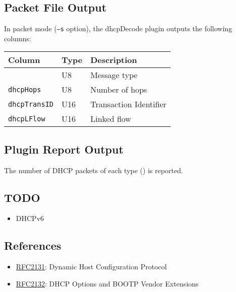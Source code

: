 \documentclass[documentation]{subfiles}
\begin{document}
\subsection{Packet File Output}
In packet mode ({\tt --s} option), the dhcpDecode plugin outputs the following columns:
\begin{longtable}{lll}
    \toprule
    {\bf Column} & {\bf Type} & {\bf Description}\\
    \midrule\endhead%
    {\tt \nameref{dhcpMType}} & U8  & Message type\\
    {\tt dhcpHops}            & U8  & Number of hops\\
    {\tt dhcpTransID}         & U16 & Transaction Identifier\\
    {\tt dhcpLFlow}           & U16 & Linked flow\\
    \bottomrule
\end{longtable}

\subsection{Plugin Report Output}
The number of DHCP packets of each type () is reported.



\subsection{TODO}
\begin{itemize}
    \item DHCPv6
\end{itemize}

\subsection{References}
\begin{itemize}
    \item \href{https://tools.ietf.org/html/rfc2131}{RFC2131}: Dynamic Host Configuration Protocol
    \item \href{https://tools.ietf.org/html/rfc2132}{RFC2132}: DHCP Options and BOOTP Vendor Extensions
\end{itemize}
\end{document}
